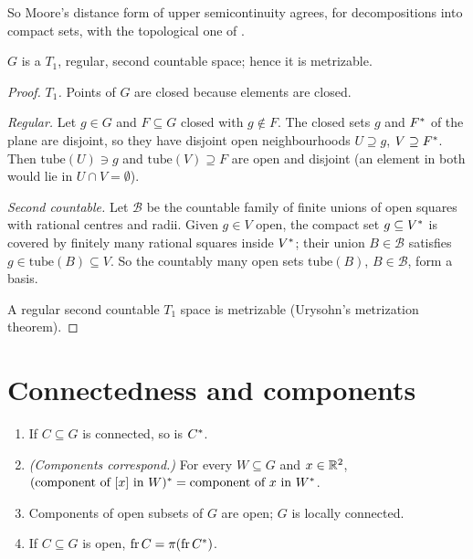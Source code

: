 
So Moore's distance form of upper semicontinuity agrees, for decompositions into compact sets,
with the topological one of .

\begin{theorem}\label{thm:quot-metrizable}
$G$ is a $T_1$, regular, second countable space; hence it is metrizable.
\end{theorem}

\begin{proof}
\emph{$T_1$.} Points of $G$ are closed because elements are closed.

\emph{Regular.} Let $g\in G$ and $F\subseteq G$ closed with $g\notin F$. The closed sets $g$ and $F^{\ast}$
of the plane are disjoint, so they have disjoint open neighbourhoods $U\supseteq g$, $V\supseteq F^{\ast}$. Then $\mathrm{tube}(U)\ni g$ and $\mathrm{tube}(V)\supseteq F$ are open and disjoint (an element in
both would lie in $U\cap V=\emptyset$).

\emph{Second countable.} Let $\mathcal B$ be the countable family of finite unions of open squares
with rational centres and radii. Given $g\in V$ open, the compact set $g\subseteq V^{\ast}$ is covered by
finitely many rational squares inside $V^{\ast}$; their union $B\in\mathcal B$ satisfies $g\in
\mathrm{tube}(B)\subseteq V$. So the countably many open sets $\mathrm{tube}(B)$, $B\in\mathcal B$, form a
basis.

A regular second countable $T_1$ space is metrizable (Urysohn's metrization theorem).
\end{proof}


\section{Connectedness and components}

\begin{proposition}\label{prop:pts-conn}
\leavevmode
\begin{enumerate}[label=(\alph*)]
\item If $C\subseteq G$ is connected, so is $C^{\ast}$.
\item \emph{(Components correspond.)} For every $W\subseteq G$ and $x\in\mathbb{R}^2$,
$(\text{component of }[x]\text{ in }W)^{\ast}=\text{component of }x\text{ in }W^{\ast}$.
\item Components of open subsets of $G$ are open; $G$ is locally connected.
\item If $C\subseteq G$ is open, $\operatorname{fr} C=\pi(\operatorname{fr}C^{\ast})$.
\end{enumerate}
\end{proposition}

